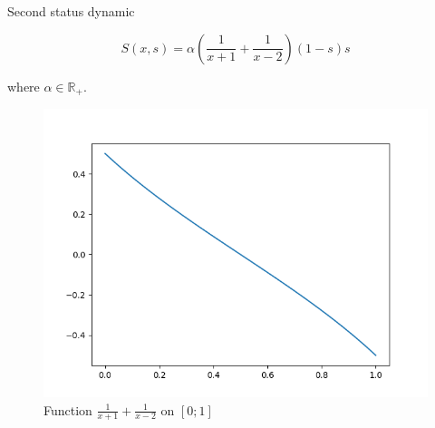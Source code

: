 \documentclass[10pt]{beamer}
\begin{document}
\begin{frame}{Second status dynamic}

\begin{equation}
\label{eq:sdyn2}
S(x,s) =  \alpha (\frac{1}{x+1} + \frac{1}{x-2}) (1-s) s
\end{equation}

where $\alpha \in \mathbb{R}_{+}$.

\begin{figure}[H]
\centering
\includegraphics[scale=0.3]{functionofs2.png}
\caption{Function $\frac{1}{x+1}+\frac{1}{x-2}$ on $[0;1]$}
\label{fig:functionofs2}
\end{figure}

\end{frame}
\end{document}
